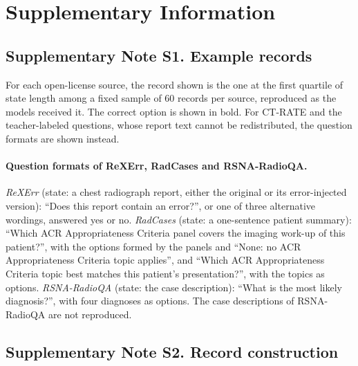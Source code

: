 \documentclass[11pt]{article}
\begin{document}
\FloatBarrier



\clearpage
\section*{Supplementary Information}
\setcounter{table}{0}
\setcounter{figure}{0}

\subsection*{Supplementary Note S1. Example records}
For each open-license source, the record shown is the one at the first quartile of state length among a fixed sample of 60 records per source, reproduced as the models received it. The correct option is shown in bold. For CT-RATE and the teacher-labeled questions, whose report text cannot be redistributed, the question formats are shown instead.



\paragraph{Question formats of ReXErr, RadCases and RSNA-RadioQA.} \emph{ReXErr} (state: a chest radiograph report, either the original or its error-injected version): ``Does this report contain an error?'', or one of three alternative wordings, answered yes or no. \emph{RadCases} (state: a one-sentence patient summary): ``Which ACR Appropriateness Criteria panel covers the imaging work-up of this patient?'', with the  options formed by the panels and ``None: no ACR Appropriateness Criteria topic applies'', and ``Which ACR Appropriateness Criteria topic best matches this patient's presentation?'', with the  topics as options. \emph{RSNA-RadioQA} (state: the case description): ``What is the most likely diagnosis?'', with four diagnoses as options. The case descriptions of RSNA-RadioQA are not reproduced.

\FloatBarrier
\subsection*{Supplementary Note S2. Record construction}
\end{document}

